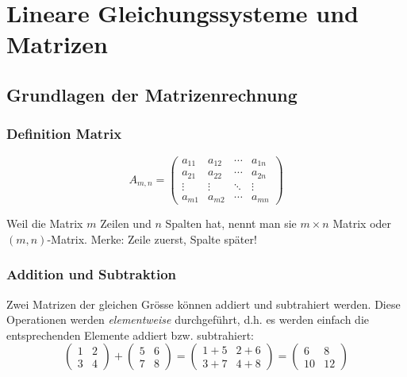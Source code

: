\section{Lineare Gleichungssysteme und Matrizen}
\subsection{Grundlagen der Matrizenrechnung}

\subsubsection{Definition Matrix}%
\label{ssub:Definition Matrix}


\begin{equation*}
  A_{m,n} =
  \begin{pmatrix} 
    a_{11} & a_{12} & \cdots & a_{1n} \\
    a_{21} & a_{22} & \cdots & a_{2n} \\
    \vdots  & \vdots  & \ddots & \vdots  \\
    a_{m1} & a_{m2} & \cdots & a_{mn} 
  \end{pmatrix} 
\end{equation*}

Weil die Matrix $m$ Zeilen und $n$ Spalten hat, nennt man sie $m\times n$ Matrix oder $(m,n)$-Matrix.
Merke: Zeile zuerst, Spalte später!

\subsubsection{Addition und Subtraktion}%
\label{ssub:Addition und Subtraktion}
Zwei Matrizen der gleichen Grösse können addiert und subtrahiert werden. Diese Operationen werden \textit{elementweise} durchgeführt, d.h. es werden einfach die entsprechenden Elemente addiert bzw. subtrahiert:
\begin{equation*}
  \begin{pmatrix} 
    1 & 2 \\
    3 & 4
  \end{pmatrix} 
  +
  \begin{pmatrix} 
    5 & 6 \\
    7 & 8
  \end{pmatrix} 
  =
  \begin{pmatrix} 
    1+5 & 2+6 \\
    3+7 & 4+8 
  \end{pmatrix} 
  =
  \begin{pmatrix} 
    6 & 8 \\
    10 & 12 
  \end{pmatrix} 
\end{equation*}

